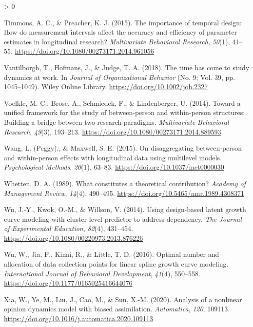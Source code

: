 \documentclass[
12pt, %
twoside,
english]{guelphthesis}
\newlength{\cslhangindent}
\newenvironment{CSLReferences}[2] %
 {%
  \setlength{\parindent}{0pt}
  \ifodd #1 \everypar{\setlength{\hangindent}{\cslhangindent}}\ignorespaces\fi
  \ifnum #2 > 0
  \setlength{\parskip}{\linespacing{2}}
  \fi
 }%
 {}
\theoremstyle{definition}
\theoremstyle{definition}
\theoremstyle{definition}
\theoremstyle{definition}
\theoremstyle{remark}
\begin{document}
\begin{CSLReferences}{1}{0}
\leavevmode{}%
Timmons, A. C., \& Preacher, K. J. (2015). The importance of temporal design: How do measurement intervals affect the accuracy and efficiency of parameter estimates in longitudinal research? \emph{Multivariate Behavioral Research}, \emph{50}(1), 41--55. \url{https://doi.org/10.1080/00273171.2014.961056}

\leavevmode{}%
Vantilborgh, T., Hofmans, J., \& Judge, T. A. (2018). The time has come to study dynamics at work. In \emph{Journal of Organizational Behavior} (No. 9; Vol. 39, pp. 1045--1049). Wiley Online Library. \url{https://doi.org/10.1002/job.2327}

\leavevmode{}%
Voelkle, M. C., Brose, A., Schmiedek, F., \& Lindenberger, U. (2014). Toward a unified framework for the study of between-person and within-person structures: Building a bridge between two research paradigms. \emph{Multivariate Behavioral Research}, \emph{49}(3), 193--213. \url{https://doi.org/10.1080/00273171.2014.889593}

\leavevmode{}%
Wang, L. (Peggy)., \& Maxwell, S. E. (2015). On disaggregating between-person and within-person effects with longitudinal data using multilevel models. \emph{Psychological Methods}, \emph{20}(1), 63--83. \url{https://doi.org/10.1037/met0000030}

\leavevmode{}%
Whetten, D. A. (1989). What constitutes a theoretical contribution? \emph{Academy of Management Review}, \emph{14}(4), 490--495. \url{https://doi.org/10.5465/amr.1989.4308371}

\leavevmode{}%
Wu, J.-Y., Kwok, O.-M., \& Willson, V. (2014). Using design-based latent growth curve modeling with cluster-level predictor to address dependency. \emph{The Journal of Experimental Education}, \emph{82}(4), 431--454. \url{https://doi.org/10.1080/00220973.2013.876226}

\leavevmode{}%
Wu, W., Jia, F., Kinai, R., \& Little, T. D. (2016). Optimal number and allocation of data collection points for linear spline growth curve modeling. \emph{International Journal of Behavioral Development}, \emph{41}(4), 550--558. \url{https://doi.org/10.1177/0165025416644076}

\leavevmode{}%
Xia, W., Ye, M., Liu, J., Cao, M., \& Sun, X.-M. (2020). Analysis of a nonlinear opinion dynamics model with biased assimilation. \emph{Automatica}, \emph{120}, 109113. \url{https://doi.org/10.1016/j.automatica.2020.109113}


\end{CSLReferences}
\end{document}
